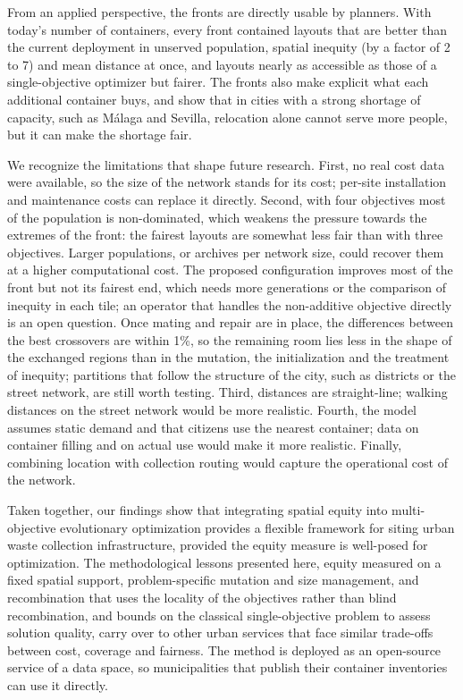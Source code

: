 From an applied perspective, the fronts are directly usable by planners. With today's number of containers, every front contained layouts that are better than the current deployment in unserved population, spatial inequity (by a factor of 2 to 7) and mean distance at once, and layouts nearly as accessible as those of a single-objective optimizer but fairer. The fronts also make explicit what each additional container buys, and show that in cities with a strong shortage of capacity, such as Málaga and Sevilla, relocation alone cannot serve more people, but it can make the shortage fair.

We recognize the limitations that shape future research. First, no real cost data were available, so the size of the network stands for its cost; per-site installation and maintenance costs can replace it directly. Second, with four objectives most of the population is non-dominated, which weakens the pressure towards the extremes of the front: the fairest layouts are somewhat less fair than with three objectives. Larger populations, or archives per network size, could recover them at a higher computational cost. The proposed configuration improves most of the front but not its fairest end, which needs more generations or the comparison of inequity in each tile; an operator that handles the non-additive objective directly is an open question. Once mating and repair are in place, the differences between the best crossovers are within 1\%, so the remaining room lies less in the shape of the exchanged regions than in the mutation, the initialization and the treatment of inequity; partitions that follow the structure of the city, such as districts or the street network, are still worth testing. Third, distances are straight-line; walking distances on the street network would be more realistic. Fourth, the model assumes static demand and that citizens use the nearest container; data on container filling and on actual use would make it more realistic. Finally, combining location with collection routing would capture the operational cost of the network.

Taken together, our findings show that integrating spatial equity into multi-objective evolutionary optimization provides a flexible framework for siting urban waste collection infrastructure, provided the equity measure is well-posed for optimization. The methodological lessons presented here, equity measured on a fixed spatial support, problem-specific mutation and size management, and recombination that uses the locality of the objectives rather than blind recombination, and bounds on the classical single-objective problem to assess solution quality, carry over to other urban services that face similar trade-offs between cost, coverage and fairness. The method is deployed as an open-source service of a data space, so municipalities that publish their container inventories can use it directly.
